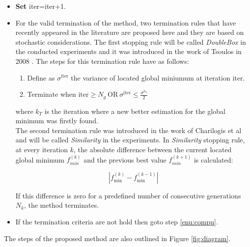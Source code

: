 \documentclass[journal,article,submit,pdftex,moreauthors]{Definitions/mdpi}
\begin{document}
\begin{enumerate}
\begin{itemize}
 \item \textbf{Set} iter=iter+1. 

\item For the  valid termination of the method, two termination rules that have recently appeared in the literature are proposed here and they are based on  stochastic considerations. The first stopping rule will be called \textit{DoubleBox} in the conducted experiments and it was introduced in the work of Tsoulos in 2008 \cite{tsoulos2008modifications}. The steps for this termination rule have as follows:
\begin{enumerate}
    \item Define as $\sigma^{\mbox{iter}}$ the variance of located global miniumum at  iteration iter.
    \item Terminate when $\mbox{iter}\ge N_g\ \mbox{OR}\ \sigma^{\mbox{iter}} \le \frac{\sigma^{k_T}}{2} $
\end{enumerate} where $k_T$ is the iteration where a new better estimation for the global minimum was firstly found.\\
The second termination rule was introduced in the work of Charilogis et al \cite{ipso}
and will be called \textit{Similarity} in the experiments. 
In \textit{Similarity} stopping rule, at every iteration \ensuremath{k},
the absolute difference between the current located global minimum $f_{min}^{(k)}$
and the previous best value $f_{min}^{(k+1)}$ is calculated:
\begin{center}
\[
\left|f_{\mbox{min}}^{(k)}-f_{\mbox{min}}^{(k-1)}\right|
\]
\par\end{center}

If this difference is zero for a predefined number of consecutive
generations $N_{k}$, the method terminates.

\item If the termination criteria are not hold then goto step \ref{enu:compu}.
\end{itemize}

\end{enumerate}
The steps of the proposed method are also outlined in Figure \ref{fig:diagram}.
\end{document}
